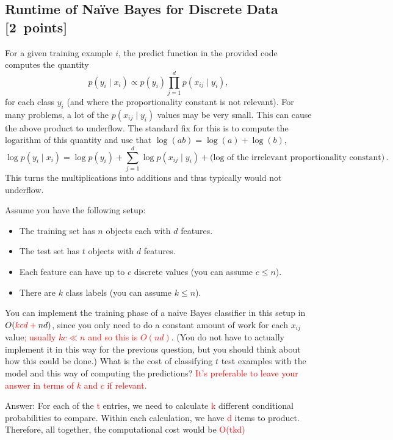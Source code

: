 \documentclass{article}
\newcommand{\blu}[1]{{\textcolor{blu}{#1}}}
\newcommand{\red}[1]{\textcolor{red}{#1}}
\newenvironment{answer}{\par\begingroup\color{gre}Answer: }{\endgroup}
\let\ask\blu
\let\update\red
\newcommand\pts[1]{\textcolor{pointscolour}{[#1~points]}}
\begin{document}
    \subsection{Runtime of Na\"ive Bayes for Discrete Data \pts{2}}

    For a given training example $i$, the predict function in the provided code computes the quantity
    \[
    p(y_i \mid x_i) \propto p(y_i)\prod_{j=1}^d p(x_{ij} \mid y_i),
    \]
    for each class $y_i$ (and where the proportionality constant is not relevant). For many problems, a lot of the $p(x_{ij} \mid y_i)$ values may be very small. This can cause the above product to underflow. The standard fix for this is to compute the logarithm of this quantity and use that $\log(ab) = \log(a)+\log(b)$,
    \[
    \log p(y_i \mid x_i) = \log p(y_i) + \sum_{j=1}^d \log p(x_{ij} \mid y_i) + \text{(log of the irrelevant proportionality constant)} \, .
    \]
    This turns the multiplications into additions and thus typically would not underflow.

    Assume you have the following setup:
    \begin{itemize}
        \item The training set has $n$ objects each with $d$ features.
        \item The test set has $t$ objects with $d$ features.
        \item Each feature can have up to $c$ discrete values (you can assume $c \leq n$).
        \item There are $k$ class labels (you can assume $k \leq n$).
    \end{itemize}
    You can implement the training phase of a naive Bayes classifier in this setup in $O(\update{k c d + {}} nd)$, since you only need to do a constant amount of work for each $x_{ij}$ value\update{; usually $k c \ll n$ and so this is $O(n d)$}. (You do not have to actually implement it in this way for the previous question, but you should think about how this could be done.)
    \ask{What is the cost of classifying $t$ test examples with the model and this way of computing the predictions?}
    \update{It's preferable to leave your answer in terms of $k$ and $c$ if relevant.}
    \begin{answer}
        For each of the \textcolor{red}{t} entries, we need to calculate \textcolor{red}{k} different conditional probabilities to compare. Within each calculation, we have \textcolor{red}{d} items to product. Therefore, all together, the computational cost would be \textcolor{red}{O(tkd)}
    \end{answer}
\end{document}
